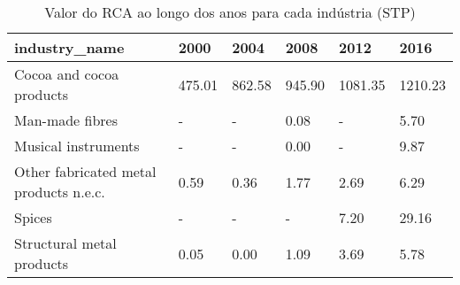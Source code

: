 \begin{table}
\centering
\caption{Valor do RCA ao longo dos anos para cada indústria (STP)}
\begin{tabular}{p{6cm}p{1.5cm}p{1.5cm}p{1.5cm}p{1.5cm}p{1.5cm}}
\toprule
                         industry\_name &   2000 &   2004 &   2008 &    2012 &    2016 \\
\midrule
              Cocoa and cocoa products & 475.01 & 862.58 & 945.90 & 1081.35 & 1210.23 \\
                       Man-made fibres &      - &      - &   0.08 &       - &    5.70 \\
                   Musical instruments &      - &      - &   0.00 &       - &    9.87 \\
Other fabricated metal products n.e.c. &   0.59 &   0.36 &   1.77 &    2.69 &    6.29 \\
                                Spices &      - &      - &      - &    7.20 &   29.16 \\
             Structural metal products &   0.05 &   0.00 &   1.09 &    3.69 &    5.78 \\
\bottomrule
\end{tabular}
\end{table}
